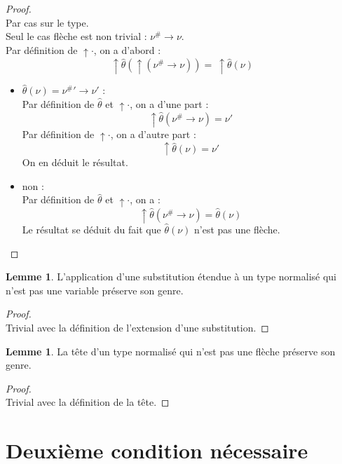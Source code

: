 \documentclass[a4paper]{report}
\newenvironment{preuve} 
  {\begin{proof}~\\} 
  {\end{proof}}
\theoremstyle{definition}
\newtheorem{lemme}[theoreme]{Lemme}
\begin{document}
\begin{preuve}
  Par cas sur le type. \\
  Seul le cas flèche est non trivial : $\nu^\# \rightarrow \nu$. \\
  Par définition de $\uparrow \cdot$, on a d'abord :
  \[ \uparrow \hat\theta (\uparrow (\nu^\# \rightarrow \nu)) =\ \uparrow \hat\theta (\nu) \]
  \begin{itemize}[label={\textbf{Si}}]
    \item 
      $\hat\theta (\nu) = {\nu^\#}' \rightarrow \nu'$ : \\
      Par définition de $\hat\theta$ et $\uparrow \cdot$, on a d'une part :
      \[ \uparrow \hat\theta (\nu^\# \rightarrow \nu) = \nu' \]
      Par définition de $\uparrow \cdot$, on a d'autre part :
      \[ \uparrow \hat\theta (\nu) = \nu' \]
      On en déduit le résultat.
    \item 
      non : \\
      Par définition de $\hat\theta$ et $\uparrow \cdot$, on a :
      \[ \uparrow \hat\theta (\nu^\# \rightarrow \nu) = \hat\theta (\nu) \]
      Le résultat se déduit du fait que $\hat\theta (\nu)$ n'est pas une flèche.
  \end{itemize}
\end{preuve}

\begin{lemme} \label{non_var_implique_subst_preserve_genre}
  L'application d'une substitution étendue à un type normalisé qui n'est pas une variable préserve son genre.
\end{lemme}

\begin{preuve}
  Trivial avec la définition de l'extension d'une substitution.
\end{preuve}

\begin{lemme} \label{non_fleche_implique_tete_preserve_genre}
  La tête d'un type normalisé qui n'est pas une flèche préserve son genre.
\end{lemme}

\begin{preuve}
  Trivial avec la définition de la tête.
\end{preuve}


\section{Deuxième condition nécessaire}
\end{document}
